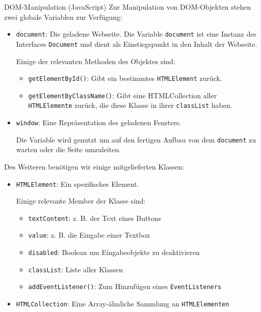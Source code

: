 \begin{defi}{DOM-Manipulation (JavaScript)}
    Zur Manipulation von DOM-Objekten stehen zwei globale Variablen zur Verfügung:
    \begin{itemize}
        \item \texttt{document}: Die geladene Webseite.
              Die Variable \texttt{document} ist eine Instanz des Interfaces \texttt{Document} und dient als Einstiegspunkt in den Inhalt der Webseite.

              Einige der relevanten Methoden des Objektes sind:
              \begin{itemize}
                  \item \texttt{getElementById()}: Gibt ein bestimmtes \texttt{HTMLElement} zurück.
                  \item \texttt{getElementByClassName()}: Gibt eine HTMLCollection aller \texttt{HTMLElemente} zurück, die diese Klasse in ihrer \texttt{classList} haben.
              \end{itemize}
        \item \texttt{window}: Eine Repräsentation des geladenen Fensters.

              Die Variable wird genutzt um auf den fertigen Aufbau von dem \texttt{document} zu warten oder die Seite umzuleiten.
    \end{itemize}

    Des Weiteren benötigen wir einige mitgelieferten Klassen:
    \begin{itemize}
        \item \texttt{HTMLElement}: Ein spezifisches Element.

              Einige relevante Member der Klasse sind:
              \begin{itemize}
                  \item \texttt{textContent}: z. B. der Text eines Buttons
                  \item \texttt{value}: z. B. die Eingabe einer Textbox
                  \item \texttt{disabled}: Boolean um Eingabeobjekte zu deaktivieren
                  \item \texttt{classList}: Liste aller Klassen
                  \item \texttt{addEventListener()}: Zum Hinzufügen eines \texttt{EventListeners}
              \end{itemize}
        \item \texttt{HTMLCollection}: Eine Array-ähnliche Sammlung an \texttt{HTMLElementen}


\end{itemize}
\end{defi}
